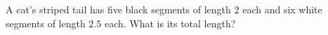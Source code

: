 A cat's striped tail has five black segments of length $2$ each and six white segments of length $2.5$ each. What is its total length?
